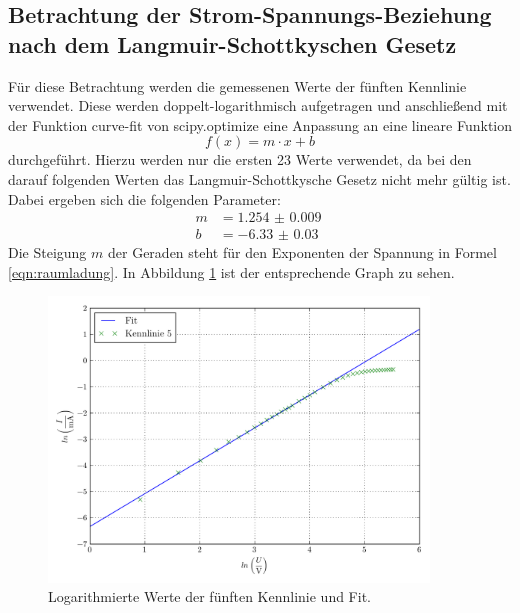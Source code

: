 \documentclass[
  bibliography=totoc,     %
  captions=tableheading,  %
  titlepage=firstiscover, %
]{scrartcl}
\begin{document}
\subsection{Betrachtung der Strom-Spannungs-Beziehung nach dem Langmuir-Schottkyschen Gesetz}
Für diese Betrachtung werden die gemessenen Werte der fünften Kennlinie verwendet.
Diese werden doppelt-logarithmisch aufgetragen und anschließend mit der Funktion
curve-fit von scipy.optimize eine Anpassung an eine lineare Funktion
\begin{equation}
  f(x) = m \cdot x + b
  \label{eqn:linear}
\end{equation}
durchgeführt. Hierzu werden nur die ersten 23 Werte verwendet, da bei den darauf
folgenden Werten das Langmuir-Schottkysche Gesetz nicht mehr gültig ist.
Dabei ergeben sich die folgenden Parameter:
\begin{align*}
  m &= \SI{1.254(9)}{} \\
  b &= \SI{-6.33(3)}{}
\end{align*}
Die Steigung $m$ der Geraden steht für den Exponenten der Spannung in Formel \eqref{eqn:raumladung}.
In Abbildung \ref{fig:plot2} ist der entsprechende Graph zu sehen.
\begin{figure}[H]
  \centering
  \includegraphics[width=0.9\textwidth]{Plot2.pdf}
  \caption{Logarithmierte Werte der fünften Kennlinie und Fit.}
  \label{fig:plot2}
\end{figure}
\end{document}
